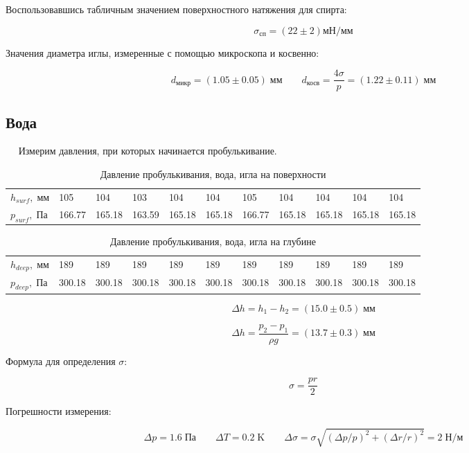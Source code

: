 \documentclass[12pt,a4paper]{article}
\begin{document}
		Воспользовавшись табличным значением поверхностного натяжения для спирта:
		
		$$\sigma_{\text{сп}} = (22 \pm 2) \text{мН} / \text{мм}$$
		
		Значения диаметра иглы, измеренные с помощью микроскопа и косвенно:
		
		$$ d_{\text{микр}} = (1.05 \pm 0.05) \; \text{мм} \qquad d_{\text{косв}} = \frac{4\sigma}{p} =  (1.22 \pm 0.11) \; \text{мм} $$
		
	\subsection*{Вода}
	
		$\quad$ Измерим давления, при которых начинается пробулькивание.
		
		\begin{table}[H]
			\caption{Давление пробулькивания, вода, игла на поверхности}
			\begin{tabular}{|l|llllllllll|}
				$h_{surf}, \; \text{мм}$ & 105    & 104    & 103    & 104    & 104    & 105    & 104    & 104    & 104    & 104    \\
				$p_{surf}, \; \text{Па}$ & 166.77 & 165.18 & 163.59 & 165.18 & 165.18 & 166.77 & 165.18 & 165.18 & 165.18 & 165.18
			\end{tabular}
		\end{table}
		
		\begin{table}[H]
			\caption{Давление пробулькивания, вода, игла на глубине}
			\begin{tabular}{|l|llllllllll|}
				$h_{deep}, \; \text{мм}$ & 189    & 189    & 189    & 189    & 189    & 189    & 189    & 189    & 189    & 189    \\
				$p_{deep}, \; \text{Па}$ & 300.18 & 300.18 & 300.18 & 300.18 & 300.18 & 300.18 & 300.18 & 300.18 & 300.18 & 300.18
			\end{tabular}
		\end{table}
	
		$$\Delta h = h_1 - h_2 = (15.0 \pm 0.5) \; \text{мм}$$
		
		$$\Delta h = \frac{p_2 - p_1}{\rho g} = (13.7 \pm 0.3) \; \text{мм}$$
	
		Формула для определения $\sigma$:
		
		$$ \sigma = \frac{pr}{2}$$
		
		Погрешности измерения:
		
		$$\varDelta p = 1.6 \; \text{Па} \qquad \varDelta T = 0.2 \; \text{K} \qquad \varDelta \sigma = \sigma \sqrt{ (\varDelta p / p)^2 + (\varDelta r / r)^2 } = 2 \; \text{Н} / \text{м}$$
\end{document}

